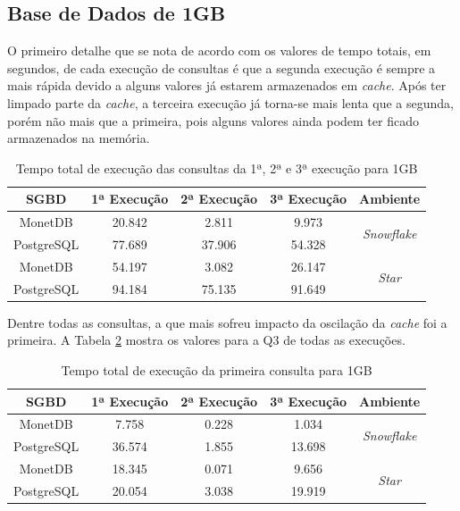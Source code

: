 \subsection{Base de Dados de 1GB}

O primeiro detalhe que se nota de acordo com os valores de tempo totais, em segundos, de cada execução de consultas é que a segunda execução é sempre a mais rápida devido a alguns valores já estarem armazenados em \textit{cache}. Após ter limpado parte da \textit{cache}, a terceira execução já torna-se mais lenta que a segunda, porém não mais que a primeira, pois alguns valores ainda podem ter ficado armazenados na memória.

\begin{table}[htpb]
        \centering
        \caption{Tempo total de execução das consultas da 1ª, 2ª e 3ª execução para 1GB}
        \label{tab:queries_cache_1}
        \begin{tabular}{|c|c|c|c|c|}
        \hline
        SGBD       & 1ª Execução & 2ª Execução & 3ª Execução & Ambiente                            \\ \hline
        MonetDB    & 20.842      & 2.811       & 9.973       & \multirow{2}{*}{\textit{Snowflake}} \\ \cline{1-4}
        PostgreSQL & 77.689      & 37.906      & 54.328      &                                     \\ \hline
        MonetDB    & 54.197      & 3.082       & 26.147      & \multirow{2}{*}{\textit{Star}}      \\ \cline{1-4}
        PostgreSQL & 94.184      & 75.135      & 91.649      &                                     \\ \hline
        \end{tabular}
\end{table}

Dentre todas as consultas, a que mais sofreu impacto da oscilação da \textit{cache} foi a primeira. A Tabela \ref{tab:q1_cache_1} mostra os valores para a Q3 de todas as execuções.

\begin{table}[htpb]
        \centering
        \caption{Tempo total de execução da primeira consulta para 1GB}
        \label{tab:q1_cache_1}
        \begin{tabular}{|c|c|c|c|c|}
        \hline
        SGBD       & 1ª Execução & 2ª Execução & 3ª Execução & Ambiente                            \\ \hline
        MonetDB    & 7.758       & 0.228       & 1.034       & \multirow{2}{*}{\textit{Snowflake}} \\ \cline{1-4}
        PostgreSQL & 36.574      & 1.855       & 13.698      &                                     \\ \hline
        MonetDB    & 18.345      & 0.071       & 9.656       & \multirow{2}{*}{\textit{Star}}      \\ \cline{1-4}
        PostgreSQL & 20.054      & 3.038       & 19.919      &                                     \\ \hline
\end{tabular}
\end{table}


